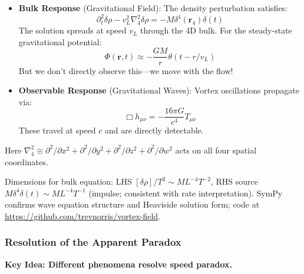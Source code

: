 \begin{itemize}
\item \textbf{Bulk Response} (Gravitational Field): The density perturbation satisfies:
\begin{equation}
\partial_t^2 \delta\rho - v_L^2 \nabla_4^2 \delta\rho = -M\delta^4(\mathbf{r}_4)\delta(t)
\end{equation}
The solution spreads at speed $v_L$ through the 4D bulk. For the steady-state gravitational potential:
\begin{equation}
\Phi(\mathbf{r},t) \approx -\frac{GM}{r} \theta(t - r/v_L)
\end{equation}
But we don't directly observe this---we move with the flow!

\item \textbf{Observable Response} (Gravitational Waves): Vortex oscillations propagate via:
\begin{equation}
\Box h_{\mu\nu} = -\frac{16\pi G}{c^4} T_{\mu\nu}
\end{equation}
These travel at speed $c$ and are directly detectable.
\end{itemize}

Here $\nabla_4^2 \equiv \partial^2/\partial x^2 + \partial^2/\partial y^2 + \partial^2/\partial z^2 + \partial^2/\partial w^2$ acts on all four spatial coordinates.



Dimensions for bulk equation: LHS $[\delta\rho] / T^2 \sim M L^{-4} T^{-2}$, RHS source $M \delta^4 \delta(t) \sim M L^{-4} T^{-1}$ (impulse; consistent with rate interpretation). SymPy confirms wave equation structure and Heaviside solution form; code at \url{https://github.com/trevnorris/vortex-field}.

\subsubsection{Resolution of the Apparent Paradox}

\textbf{Key Idea: Different phenomena resolve speed paradox.}

